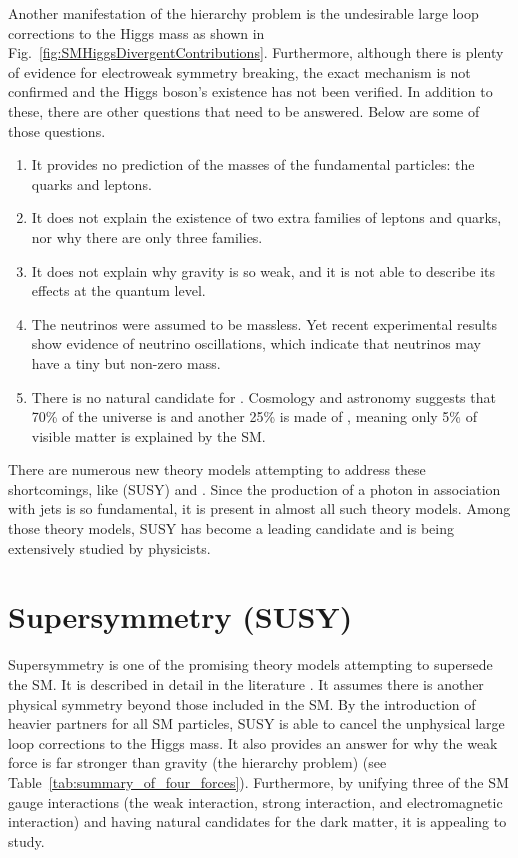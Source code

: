 Another manifestation of the hierarchy problem is the undesirable large loop corrections to the Higgs mass as shown in Fig.~\ref{fig:SMHiggsDivergentContributions}. Furthermore, although there is plenty of evidence for electroweak symmetry breaking, the exact mechanism is not confirmed and the Higgs boson's existence has not been verified. In addition to these, there are other questions that need to be answered. Below are some of those questions.
\vspace{-0.01\textheight}
\begin{singlespace}
\begin{enumerate}
 \item It provides no prediction of the masses of the fundamental particles: the quarks and leptons.
 \item It does not explain the existence of two extra families of leptons and quarks, nor why there are only three families.
 \item It does not explain why gravity is so weak, and it is not able to describe its effects at the quantum level.
 \item The neutrinos were assumed to be massless. Yet recent experimental results show evidence of neutrino oscillations, which indicate that neutrinos may have a tiny but non-zero mass.
 \item There is no natural candidate for . Cosmology and astronomy suggests that 70\% of the universe is  and another 25\% is made of , meaning only 5\% of visible matter is explained by the SM.
\end{enumerate}
\end{singlespace}

There are numerous new theory models attempting to address these shortcomings, like  (SUSY) and  \cite{pap:TechnicolorModel}. Since the production of a photon in association with jets is so fundamental, it is present in almost all such theory models. Among those theory models, SUSY has become a leading candidate and is being extensively studied by physicists.

\section{Supersymmetry (SUSY)}
Supersymmetry is one of the promising theory models attempting to supersede the SM. It is described in detail in the literature \cite{pap:SUSY_SMartin, pap:SUSY_IJRAitchison}. It assumes there is another physical symmetry beyond those included in the SM. By the introduction of heavier partners for all SM particles, SUSY is able to cancel the unphysical large loop corrections to the Higgs mass. It also provides an answer for why the weak force is far stronger than gravity (the hierarchy problem) (see Table~\ref{tab:summary_of_four_forces}). Furthermore, by unifying three of the SM gauge interactions (the weak interaction, strong interaction, and electromagnetic interaction) and having natural candidates for the dark matter, it is appealing to study.

